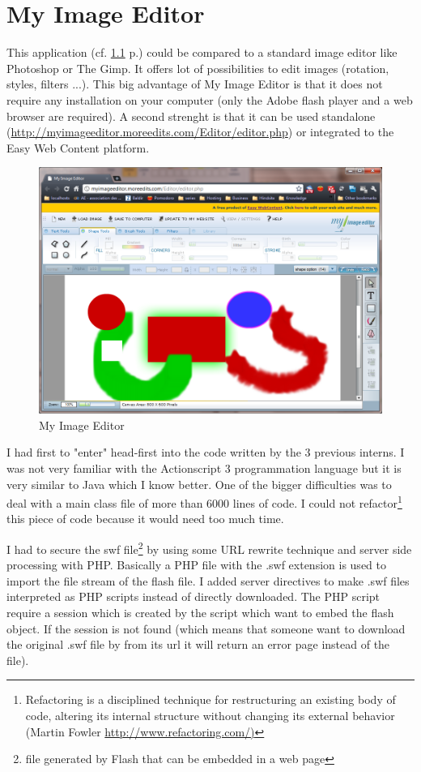 \chapter{My Image Editor}

This application (cf. \ref{figure:ewc-image_editor} p.\pageref{figure:ewc-image_editor}) could be compared to a standard image editor like Photoshop or The Gimp. It offers lot of possibilities to edit images (rotation, styles, filters ...). This big advantage of My Image Editor is that it does not require any installation on your computer (only the Adobe flash player and a web browser are required). A second strenght is that it can be used standalone (\url{http://myimageeditor.moreedits.com/Editor/editor.php}) or integrated to the Easy Web Content platform.


\begin{figure}[!h]
\centering
\includegraphics[width=.80\textwidth]{img/my_image_editor.png}
\caption{My Image Editor}
\label{figure:ewc-image_editor}
\end{figure}

I had first to "enter" head-first into the code written by the 3 previous interns. I was not very familiar with the Actionscript 3 programmation language but it is very similar to Java which I know better. One of the bigger difficulties was to deal with a main class file of more than 6000 lines of code. I could not refactor\footnote{Refactoring is a disciplined technique for restructuring an existing body of code, altering its internal structure without changing its external behavior (Martin Fowler \url{http://www.refactoring.com/)}} this piece of code because it would need too much time. 

I had to secure the swf file\footnote{file generated by Flash that can be embedded in a web page} by  using some URL rewrite technique and server side processing with PHP. Basically a PHP file with the .swf extension is used to import the file stream of the flash file. I added server directives to make .swf files interpreted as PHP scripts instead of directly downloaded. The PHP script require a session which is created by the script which want to embed the flash object. If the session is not found (which means that someone want to download the original .swf file by from its url it will return an error page instead of the file).

